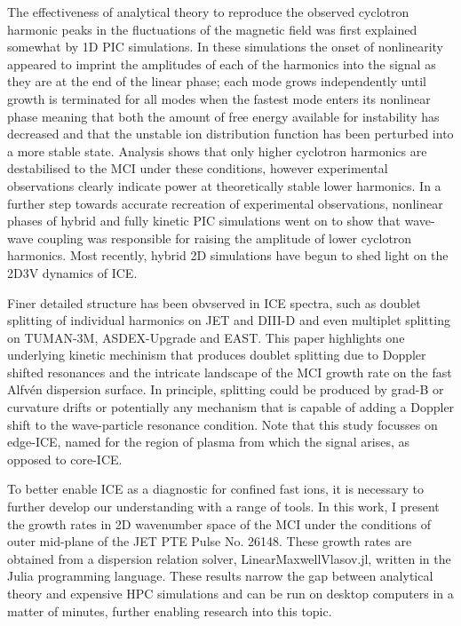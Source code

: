 \documentclass[12pt]{iopart}
\begin{document}
The effectiveness of analytical theory to reproduce the observed cyclotron
harmonic peaks in the fluctuations of the magnetic field was first explained
somewhat by 1D PIC simulations\cite{Cook2013}.
In these simulations the onset of nonlinearity
appeared to imprint the amplitudes of each of the harmonics into the signal as
they are at the end of the linear phase; each mode grows independently until 
growth is terminated for all modes when the fastest mode enters its nonlinear
phase meaning that both the amount of free energy available for instability has
decreased and that the unstable ion distribution function has been
perturbed into a more stable state. Analysis shows that only higher cyclotron
harmonics are destabilised\cite{McClements2015} to the MCI under these
conditions, however experimental
observations clearly indicate power at theoretically stable lower
harmonics\cite{Cottrell1988}. In a further step towards accurate recreation of
experimental observations, nonlinear phases of hybrid\cite{Carbajal2014} and
fully kinetic\cite{Cook2013,Chapman2017} PIC simulations went on to show that
wave-wave coupling was responsible for raising the amplitude of lower cyclotron
harmonics. Most recently, hybrid 2D simulations have begun to shed light on the
2D3V dynamics of ICE\cite{Carbajal2021}.

Finer detailed structure has been obvserved in ICE spectra, such as doublet
splitting of individual harmonics on JET\cite{Cottrell1993} and
DIII-D\cite{Thome2018} and even multiplet splitting on TUMAN-3M\cite{Askinazi2018},
ASDEX-Upgrade\cite{Ochoukov2019} and EAST\cite{Lui2020}.
This paper highlights one underlying kinetic mechinism that produces
doublet splitting due to Doppler shifted resonances and the
intricate landscape of the MCI growth rate on the fast Alfv{\'e}n dispersion
surface. In principle, splitting could be produced by grad-B or curvature
drifts\cite{Cottrell1993,Fulop1998} or potentially any mechanism that is capable
of adding a Doppler shift to the wave-particle resonance condition. Note that
this study focusses on edge-ICE, named for the region of plasma from which the signal
arises, as opposed to core-ICE\cite{Ochoukov2018, Liu2020}. 

To better enable ICE as a diagnostic for confined fast ions, it is necessary to
further develop our understanding with a range of tools. In this work, I present
the growth rates in 2D wavenumber space of the MCI under the conditions of
outer mid-plane of the JET PTE\cite{Cottrell1993} Pulse No. 26148. These growth
rates are obtained from a dispersion relation solver,
LinearMaxwellVlasov.jl\cite{LinearMaxwellVlasov.jl}, written in the Julia programming
language\cite{Bezanson2017}. These results narrow the gap between analytical
theory and expensive HPC simulations and can be run on desktop computers
in a matter of minutes, further enabling research into this topic.
\end{document}
